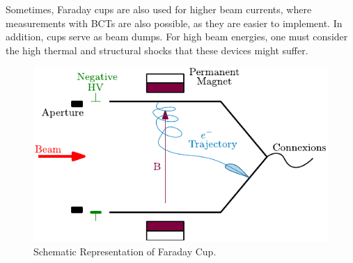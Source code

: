 Sometimes, Faraday cups are also used for higher beam currents, where measurements with BCTs are also possible, as they are easier to implement. In addition, cups serve as beam dumps. For high beam energies, one must consider the high thermal and structural shocks that these devices might suffer.

\begin{figure}[h]
    \centering
    \includegraphics[width=0.6\columnwidth]{FCschema/FCschema.pdf}
    \caption{Schematic Representation of Faraday Cup. }
    \label{fig:FaradayCup}
\end{figure}
